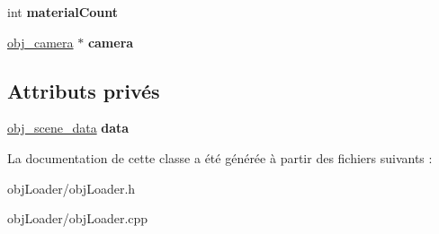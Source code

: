 \begin{DoxyCompactItemize}
\item 
\hypertarget{classobj_loader_abb07f303c115a4065742ed34525d8648}{int {\bfseries material\-Count}}\label{classobj_loader_abb07f303c115a4065742ed34525d8648}

\item 
\hypertarget{classobj_loader_ae3816c50d52bea3f75868e8e2f93e973}{\hyperlink{structobj__camera}{obj\-\_\-camera} $\ast$ {\bfseries camera}}\label{classobj_loader_ae3816c50d52bea3f75868e8e2f93e973}

\end{DoxyCompactItemize}
\subsection*{Attributs privés}
\begin{DoxyCompactItemize}
\item 
\hypertarget{classobj_loader_a47f90c82456395daf00611ecb6a10eca}{\hyperlink{structobj__scene__data}{obj\-\_\-scene\-\_\-data} {\bfseries data}}\label{classobj_loader_a47f90c82456395daf00611ecb6a10eca}

\end{DoxyCompactItemize}


La documentation de cette classe a été générée à partir des fichiers suivants \-:\begin{DoxyCompactItemize}
\item 
obj\-Loader/obj\-Loader.\-h\item 
obj\-Loader/obj\-Loader.\-cpp\end{DoxyCompactItemize}
